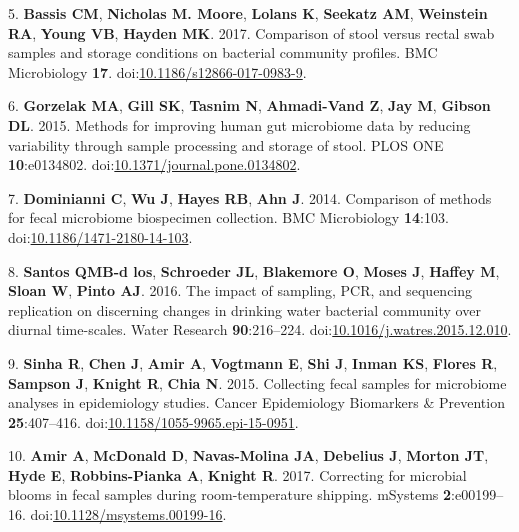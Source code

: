 \documentclass[11pt,]{article}
\begin{document}
\hypertarget{ref-Bassis2017}{}
5. \textbf{Bassis CM}, \textbf{Nicholas M. Moore}, \textbf{Lolans K},
\textbf{Seekatz AM}, \textbf{Weinstein RA}, \textbf{Young VB},
\textbf{Hayden MK}. 2017. Comparison of stool versus rectal swab samples
and storage conditions on bacterial community profiles. BMC Microbiology
\textbf{17}.
doi:\href{https://doi.org/10.1186/s12866-017-0983-9}{10.1186/s12866-017-0983-9}.

\hypertarget{ref-Gorzelak2015}{}
6. \textbf{Gorzelak MA}, \textbf{Gill SK}, \textbf{Tasnim N},
\textbf{Ahmadi-Vand Z}, \textbf{Jay M}, \textbf{Gibson DL}. 2015.
Methods for improving human gut microbiome data by reducing variability
through sample processing and storage of stool. PLOS ONE
\textbf{10}:e0134802.
doi:\href{https://doi.org/10.1371/journal.pone.0134802}{10.1371/journal.pone.0134802}.

\hypertarget{ref-Dominianni2014}{}
7. \textbf{Dominianni C}, \textbf{Wu J}, \textbf{Hayes RB}, \textbf{Ahn
J}. 2014. Comparison of methods for fecal microbiome biospecimen
collection. BMC Microbiology \textbf{14}:103.
doi:\href{https://doi.org/10.1186/1471-2180-14-103}{10.1186/1471-2180-14-103}.

\hypertarget{ref-BautistadelosSantos2016}{}
8. \textbf{Santos QMB-d los}, \textbf{Schroeder JL}, \textbf{Blakemore
O}, \textbf{Moses J}, \textbf{Haffey M}, \textbf{Sloan W}, \textbf{Pinto
AJ}. 2016. The impact of sampling, PCR, and sequencing replication on
discerning changes in drinking water bacterial community over diurnal
time-scales. Water Research \textbf{90}:216--224.
doi:\href{https://doi.org/10.1016/j.watres.2015.12.010}{10.1016/j.watres.2015.12.010}.

\hypertarget{ref-Sinha2015}{}
9. \textbf{Sinha R}, \textbf{Chen J}, \textbf{Amir A}, \textbf{Vogtmann
E}, \textbf{Shi J}, \textbf{Inman KS}, \textbf{Flores R},
\textbf{Sampson J}, \textbf{Knight R}, \textbf{Chia N}. 2015. Collecting
fecal samples for microbiome analyses in epidemiology studies. Cancer
Epidemiology Biomarkers \& Prevention \textbf{25}:407--416.
doi:\href{https://doi.org/10.1158/1055-9965.epi-15-0951}{10.1158/1055-9965.epi-15-0951}.

\hypertarget{ref-Amir2017b}{}
10. \textbf{Amir A}, \textbf{McDonald D}, \textbf{Navas-Molina JA},
\textbf{Debelius J}, \textbf{Morton JT}, \textbf{Hyde E},
\textbf{Robbins-Pianka A}, \textbf{Knight R}. 2017. Correcting for
microbial blooms in fecal samples during room-temperature shipping.
mSystems \textbf{2}:e00199--16.
doi:\href{https://doi.org/10.1128/msystems.00199-16}{10.1128/msystems.00199-16}.
\end{document}
